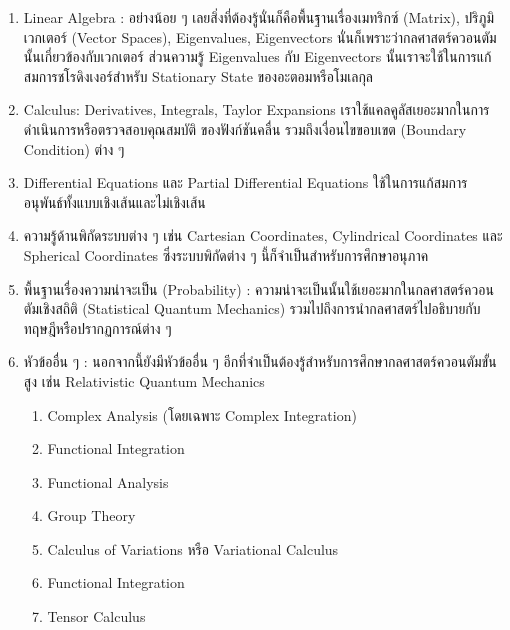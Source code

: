 \begin{enumerate}[topsep=0pt,noitemsep]
  \setlength\itemsep{1em}
  \item Linear Algebra : อย่างน้อย ๆ เลยสิ่งที่ต้องรู้นั่นก็คือพื้นฐานเรื่องเมทริกซ์ (Matrix), ปริภูมิเวกเตอร์ (Vector Spaces),
        Eigenvalues, Eigenvectors นั่นก็เพราะว่ากลศาสตร์ควอนตัมนั้นเกี่ยวข้องกับเวกเตอร์ ส่วนความรู้ Eigenvalues กับ Eigenvectors
        นั้นเราจะใช้ในการแก้สมการชโรดิงเงอร์สำหรับ Stationary State ของอะตอมหรือโมเลกุล

  \item Calculus: Derivatives, Integrals, Taylor Expansions เราใช้แคลคูลัสเยอะมากในการดำเนินการหรือตรวจสอบคุณสมบัติ%
        ของฟังก์ชันคลื่น รวมถึงเงื่อนไขขอบเขต (Boundary Condition) ต่าง ๆ

  \item Differential Equations และ Partial Differential Equations ใช้ในการแก้สมการอนุพันธ์ทั้งแบบเชิงเส้นและไม่เชิงเส้น

  \item ความรู้ด้านพิกัดระบบต่าง ๆ เช่น Cartesian Coordinates, Cylindrical Coordinates และ Spherical Coordinates
        ซึ่งระบบพิกัดต่าง ๆ นี้ก็จำเป็นสำหรับการศึกษาอนุภาค

  \item พื้นฐานเรื่องความน่าจะเป็น (Probability) : ความน่าจะเป็นนั้นใช้เยอะมากในกลศาสตร์ควอนตัมเชิงสถิติ (Statistical Quantum
        Mechanics) รวมไปถึงการนำกลศาสตร์ไปอธิบายกับทฤษฎีหรือปรากฏการณ์ต่าง ๆ

  \item หัวข้ออื่น ๆ : นอกจากนี้ยังมีหัวข้ออื่น ๆ อีกที่จำเป็นต้องรู้สำหรับการศึกษากลศาสตร์ควอนตัมขั้นสูง เช่น Relativistic Quantum
        Mechanics
        \begin{enumerate}[noitemsep]
          \setlength\itemsep{0.5em}
          \item Complex Analysis (โดยเฉพาะ Complex Integration)

          \item Functional Integration

          \item Functional Analysis

          \item Group Theory

          \item Calculus of Variations หรือ Variational Calculus

          \item Functional Integration

          \item Tensor Calculus
        \end{enumerate}
\end{enumerate}

